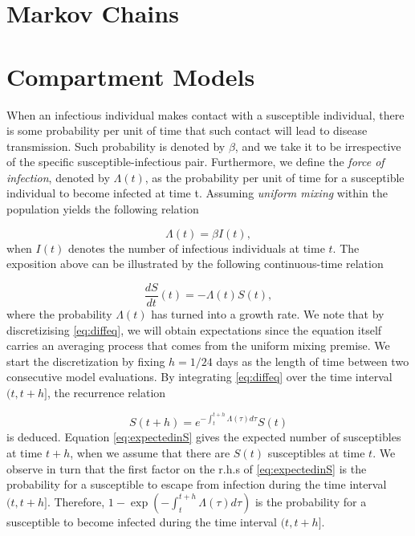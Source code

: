 \documentclass[a4paper,preprint]{elsarticle}
\begin{document}
\section{Markov Chains}

\section{Compartment Models}

When an infectious individual makes contact with a susceptible individual, there is some probability per unit of time that such contact will lead to disease transmission. Such probability is denoted by $\beta$, and we take it to be irrespective of the specific susceptible-infectious pair. Furthermore, we define the \textit{force of infection}, denoted by $\Lambda(t)$, as the probability per unit of time for a susceptible individual to become infected at time t. Assuming \textit{uniform mixing} within the population yields the following relation 

\begin{equation}
\label{eq:lawofmassaction}
\Lambda(t)=\beta I(t),
\end{equation}
when $I(t)$ denotes the number of infectious individuals at time $t$. The exposition above can be illustrated by the following continuous-time relation   

\begin{equation}
\label{eq:diffeq}
    \dfrac{dS}{dt}(t)=-\Lambda(t)S(t),
\end{equation}
%
where the probability $\Lambda(t)$ has turned into a growth rate. We note that by discretizising \eqref{eq:diffeq}, we will obtain expectations since the equation itself carries an averaging process that comes from the uniform mixing premise. We start the discretization by fixing $h=1/24$ days as the length of time between two consecutive model evaluations. By integrating \eqref{eq:diffeq} over the time interval $(t,t+h]$, the recurrence relation 

\begin{equation} 
\label{eq:expectedinS}
        S(t+h)=e^{-\int_{t}^{t+h} \Lambda(\tau)d\tau}S(t) 
\end{equation}
%
is deduced. Equation \eqref{eq:expectedinS} gives the expected number of
susceptibles  at time $t+h$, when we assume that there are $S(t)$ susceptibles
at time $t$. We observe in turn that the first factor on the r.h.s of
\eqref{eq:expectedinS} is the probability for a susceptible to escape from
infection during the time interval $(t,t+h]$. Therefore,
$1-\exp(-\int_{t}^{t+h} \Lambda(\tau)d\tau)$ is the probability for a
susceptible to become infected during the time interval $(t,t+h]$. 
\end{document}
